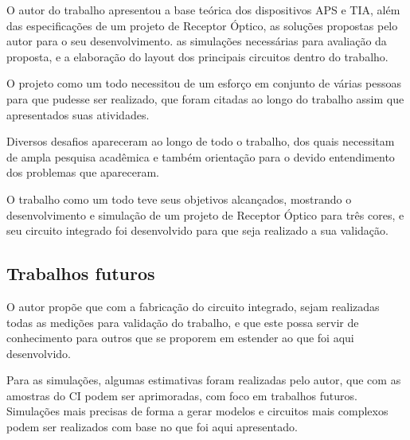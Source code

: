 
O autor do trabalho apresentou a base teórica dos dispositivos APS e TIA, além das especificações de um projeto de Receptor Óptico, as soluções propostas pelo autor para o seu desenvolvimento. as simulações necessárias para avaliação da proposta, e a elaboração do layout dos principais circuitos dentro do trabalho.

O projeto como um todo necessitou de um esforço em conjunto de várias pessoas para que pudesse ser realizado, que foram citadas ao longo do trabalho assim que apresentados suas atividades.

Diversos desafios apareceram ao longo de todo o trabalho, dos quais necessitam de ampla pesquisa acadêmica e também orientação para o devido entendimento dos problemas que apareceram.

O trabalho como um todo teve seus objetivos alcançados, mostrando o desenvolvimento e simulação de um projeto de Receptor Óptico para três cores, e seu circuito integrado foi desenvolvido para que seja realizado a sua validação.

\subsection{Trabalhos futuros}

O autor propõe que com a fabricação do circuito integrado, sejam realizadas todas as medições para validação do trabalho, e que este possa servir de conhecimento para outros que se proporem em estender ao que foi aqui desenvolvido.

Para as simulações, algumas estimativas foram realizadas pelo autor, que com as amostras do CI podem ser aprimoradas, com foco em trabalhos futuros. Simulações mais precisas de forma a gerar modelos e circuitos mais complexos podem ser realizados com base no que foi aqui apresentado.